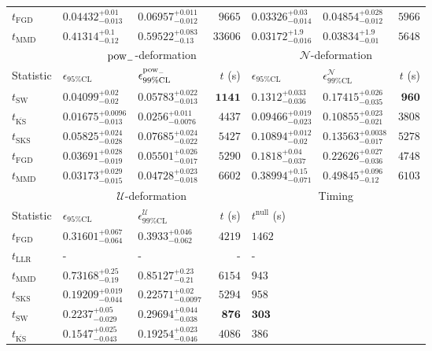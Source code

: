 \begin{tabular}{l|llr|llr}
	$t_{\mathrm{FGD}}$ & ${\mathbf{0.04432_{-0.013}^{+0.01}}}$ & ${\mathbf{0.06957_{-0.012}^{+0.011}}}$ & $9665$ & $0.03326_{-0.014}^{+0.03}$ & $0.04854_{-0.012}^{+0.028}$ & $5966$ \\
	$t_{\mathrm{MMD}}$ & $0.41314_{-0.12}^{+0.1}$ & $0.59522_{-0.13}^{+0.083}$ & $33606$ & $0.03172_{-0.016}^{+1.9}$ & $0.03834_{-0.01}^{+1.9}$ & $5648$ \\
	\toprule
	\multicolumn{1}{c}{} & \multicolumn{3}{c}{$\rm{pow}_{-}$-deformation} & \multicolumn{3}{c}{$\mathcal{N}$-deformation} \\
	Statistic & $\epsilon_{95\%\mathrm{CL}}$ & $\epsilon^  {\rm{pow}_{-}}_{99\%\mathrm{CL}}$ & $t$ (s) & $\epsilon_{95\%\mathrm{CL}}$ & $\epsilon^    {\mathcal{N}}_{99\%\mathrm{CL}}$ & $t$ (s) \\
	\midrule
	$t_{\mathrm{SW}}$ & $0.04099_{-0.02}^{+0.02}$ & $0.05783_{-0.013}^{+0.022}$ & ${\mathbf{1141}}$ & $0.1312_{-0.036}^{+0.033}$ & $0.17415_{-0.035}^{+0.026}$ & ${\mathbf{960}}$ \\
	$t_{\overline{\mathrm{KS}}}$ & ${\mathbf{0.01675_{-0.013}^{+0.0096}}}$ & ${\mathbf{0.0256_{-0.0076}^{+0.011}}}$ & $4437$ & ${\mathbf{0.09466_{-0.023}^{+0.019}}}$ & ${\mathbf{0.10855_{-0.021}^{+0.023}}}$ & $3808$ \\
	$t_{\mathrm{SKS}}$ & $0.05825_{-0.028}^{+0.024}$ & $0.07685_{-0.022}^{+0.024}$ & $5427$ & $0.10894_{-0.02}^{+0.012}$ & $0.13563_{-0.017}^{+0.0038}$ & $5278$ \\
	$t_{\mathrm{FGD}}$ & $0.03691_{-0.019}^{+0.028}$ & $0.05501_{-0.017}^{+0.026}$ & $5290$ & $0.1818_{-0.037}^{+0.04}$ & $0.22626_{-0.036}^{+0.027}$ & $4748$ \\
	$t_{\mathrm{MMD}}$ & $0.03173_{-0.015}^{+0.029}$ & $0.04728_{-0.018}^{+0.023}$ & $6602$ & $0.38994_{-0.071}^{+0.15}$ & $0.49845_{-0.12}^{+0.096}$ & $6103$ \\
	\toprule
	\multicolumn{1}{c}{} & \multicolumn{3}{c}{$\mathcal{U}$-deformation} & \multicolumn{3}{c}{Timing} \\
	Statistic & $\epsilon_{95\%\mathrm{CL}}$ & $\epsilon^    {\mathcal{U}}_{99\%\mathrm{CL}}$ & $t$ (s) & $t^{\mathrm{null}}$ (s) \\
	\midrule
	$t_{\mathrm{FGD}}$ & $0.31601_{-0.064}^{+0.067}$ & $0.3933_{-0.062}^{+0.046}$ & $4219$ & $1462$ \\
	$t_{\mathrm{LLR}}$ & - & - & - & - \\
	$t_{\mathrm{MMD}}$ & $0.73168_{-0.19}^{+0.25}$ & $0.85127_{-0.21}^{+0.23}$ & $6154$ & $943$ \\
	$t_{\mathrm{SKS}}$ & $0.19209_{-0.044}^{+0.019}$ & $0.22571_{-0.0097}^{+0.02}$ & $5294$ & $958$ \\
	$t_{\mathrm{SW}}$ & $0.2237_{-0.029}^{+0.05}$ & $0.29694_{-0.038}^{+0.044}$ & ${\mathbf{876}}$ & ${\mathbf{303}}$ \\
	$t_{\overline{\mathrm{KS}}}$ & ${\mathbf{0.1547_{-0.043}^{+0.025}}}$ & ${\mathbf{0.19254_{-0.046}^{+0.023}}}$ & $4086$ & $386$ \\
	\bottomrule
\end{tabular}
